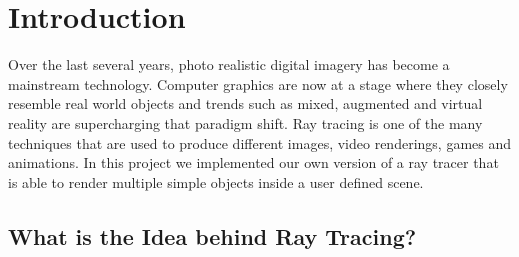 \documentclass[a4paper]{report}
\begin{document}
	\chapter{Introduction}
	Over the last several years, photo realistic digital imagery has become a mainstream technology. Computer graphics are now at a stage where they closely resemble real world objects and trends such as mixed, augmented and virtual reality are supercharging that paradigm shift. Ray tracing is one of the many techniques that are used to produce different images, video renderings, games and animations. In this project we implemented our own version of a ray tracer that is able to render multiple simple objects inside a user defined scene. 
	
	\section{What is the Idea behind  Ray Tracing?}
	
\end{document}
